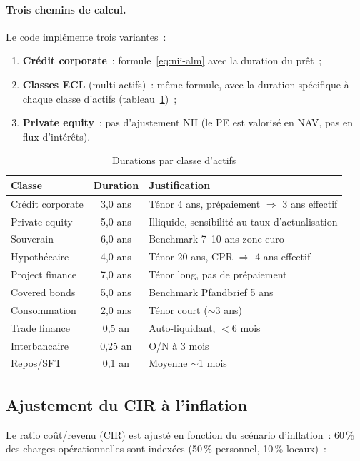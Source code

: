 \documentclass[12pt, a4paper, twoside, openright]{report}
\theoremstyle{definition}
\begin{document}
\paragraph{Trois chemins de calcul.} Le code implémente trois variantes~:
\begin{enumerate}[nosep]
  \item \textbf{Crédit corporate}~: formule~\eqref{eq:nii-alm} avec la duration du prêt~;
  \item \textbf{Classes ECL} (multi-actifs)~: même formule, avec la duration spécifique à chaque classe d'actifs (tableau~\ref{tab:durations})~;
  \item \textbf{Private equity}~: pas d'ajustement NII (le PE est valorisé en NAV, pas en flux d'intérêts).
\end{enumerate}

\begin{table}[htbp]
\centering
\caption{Durations par classe d'actifs}
\label{tab:durations}
\small
\begin{tabular}{lcp{5.5cm}}
\toprule
Classe & Duration & Justification \\
\midrule
Crédit corporate & 3{,}0 ans & Ténor 4 ans, prépaiement $\Rightarrow$ 3 ans effectif \\
Private equity & 5{,}0 ans & Illiquide, sensibilité au taux d'actualisation \\
Souverain & 6{,}0 ans & Benchmark 7--10 ans zone euro \\
Hypothécaire & 4{,}0 ans & Ténor 20 ans, CPR $\Rightarrow$ 4 ans effectif \\
Project finance & 7{,}0 ans & Ténor long, pas de prépaiement \\
Covered bonds & 5{,}0 ans & Benchmark Pfandbrief 5 ans \\
Consommation & 2{,}0 ans & Ténor court ($\sim$3 ans) \\
Trade finance & 0{,}5 an & Auto-liquidant, $< 6$ mois \\
Interbancaire & 0{,}25 an & O/N à 3 mois \\
Repos/SFT & 0{,}1 an & Moyenne $\sim$1 mois \\
\bottomrule
\end{tabular}
\end{table}

\subsection{Ajustement du CIR à l'inflation}

Le ratio coût/revenu (CIR) est ajusté en fonction du scénario d'inflation~: 60\,\% des charges opérationnelles sont indexées (50\,\% personnel, 10\,\% locaux)~:
\end{document}
